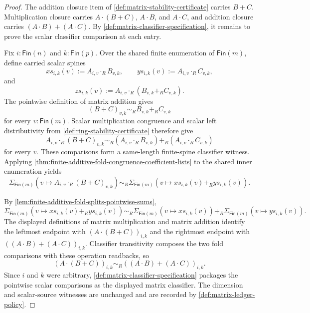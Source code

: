 \begin{proof}
The addition closure item of \autoref{def:matrix-stability-certificate} carries $B+C$. Multiplication closure carries $A\cdot(B+C)$, $A\cdot B$, and $A\cdot C$, and addition closure carries $(A\cdot B)+(A\cdot C)$. By \autoref{def:matrix-classifier-specification}, it remains to prove the scalar classifier comparison at each entry.

Fix $i:\mathsf{Fin}(n)$ and $k:\mathsf{Fin}(p)$. Over the shared finite enumeration of $\mathsf{Fin}(m)$, define carried scalar spines
$$
xs_{i,k}(v):=A_{i,v}\cdot_RB_{v,k},
\qquad
ys_{i,k}(v):=A_{i,v}\cdot_RC_{v,k},
$$
and
$$
zs_{i,k}(v):=A_{i,v}\cdot_R(B_{v,k}+_RC_{v,k}).
$$
The pointwise definition of matrix addition gives
$$
(B+C)_{v,k}\sim_RB_{v,k}+_RC_{v,k}
$$
for every $v:\mathsf{Fin}(m)$. Scalar multiplication congruence and scalar left distributivity from \autoref{def:ring-stability-certificate} therefore give
$$
A_{i,v}\cdot_R(B+C)_{v,k}
\sim_R
(A_{i,v}\cdot_RB_{v,k})+_R(A_{i,v}\cdot_RC_{v,k})
$$
for every $v$. These comparisons form a same-length finite-spine classifier witness. Applying \autoref{thm:finite-additive-fold-congruence-coefficient-lists} to the shared inner enumeration yields
$$
\Sigma_{\mathsf{Fin}(m)}(v\mapsto A_{i,v}\cdot_R(B+C)_{v,k})
\sim_R
\Sigma_{\mathsf{Fin}(m)}(v\mapsto xs_{i,k}(v)+_Rys_{i,k}(v)).
$$

By \autoref{lem:finite-additive-fold-splits-pointwise-sums},
$$
\Sigma_{\mathsf{Fin}(m)}(v\mapsto xs_{i,k}(v)+_Rys_{i,k}(v))
\sim_R
\Sigma_{\mathsf{Fin}(m)}(v\mapsto xs_{i,k}(v))
+_R
\Sigma_{\mathsf{Fin}(m)}(v\mapsto ys_{i,k}(v)).
$$
The displayed definitions of matrix multiplication and matrix addition identify the leftmost endpoint with $(A\cdot(B+C))_{i,k}$ and the rightmost endpoint with $((A\cdot B)+(A\cdot C))_{i,k}$. Classifier transitivity composes the two fold comparisons with these operation readbacks, so
$$
(A\cdot(B+C))_{i,k}
\sim_R
((A\cdot B)+(A\cdot C))_{i,k}.
$$
Since $i$ and $k$ were arbitrary, \autoref{def:matrix-classifier-specification} packages the pointwise scalar comparisons as the displayed matrix classifier. The dimension and scalar-source witnesses are unchanged and are recorded by \autoref{def:matrix-ledger-policy}.
\end{proof}

